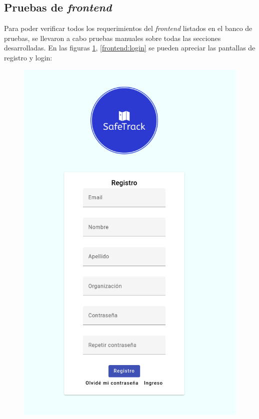 \subsection{Pruebas de \textit{frontend}}

Para poder verificar todos los requerimientos del \textit{frontend} listados en el banco de pruebas, se llevaron a cabo pruebas manuales sobre todas las secciones desarrolladas. En las figuras \ref{frontend:registro}, \ref{frontend:login}  se pueden apreciar las pantallas de registro y login:


\begin{figure}[H]
\centering
\begin{minipage}{.5\textwidth}
  \centering
  \includegraphics[width=0.9\linewidth]{./Figures/registro.png}
  \label{frontend:registro}

\end{minipage}
\end{figure}
